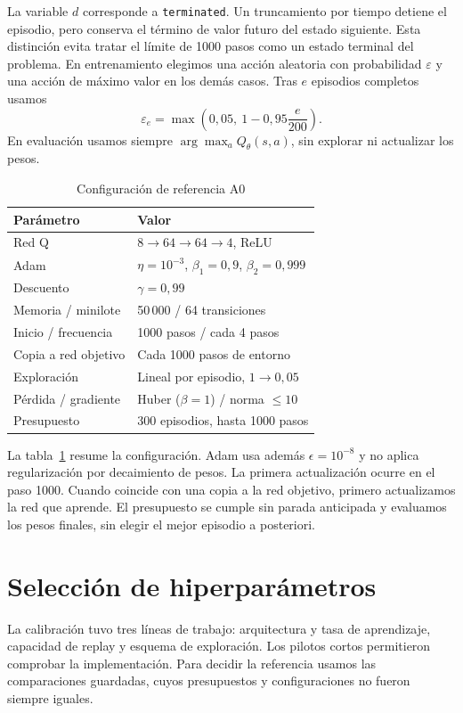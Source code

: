 \documentclass[conference]{IEEEtran}
\begin{document}
La variable $d$ corresponde a \texttt{terminated}. Un truncamiento por tiempo detiene el episodio, pero conserva el término de valor futuro del estado siguiente. Esta distinción evita tratar el límite de 1000 pasos como un estado terminal del problema. En entrenamiento elegimos una acción aleatoria con probabilidad $\varepsilon$ y una acción de máximo valor en los demás casos. Tras $e$ episodios completos usamos
\begin{equation}
 \varepsilon_e=\max\left(0{,}05,\ 1-0{,}95\frac{e}{200}\right).
\end{equation}
En evaluación usamos siempre $\arg\max_a Q_\theta(s,a)$, sin explorar ni actualizar los pesos.

\begin{table}[t]
\caption{Configuración de referencia A0}
\label{tab:hiper}
\centering
\begin{tabular}{@{}ll@{}}
\toprule
Parámetro & Valor \\
\midrule
Red Q & $8\to64\to64\to4$, ReLU \\
Adam & $\eta=10^{-3}$, $\beta_1=0{,}9$, $\beta_2=0{,}999$ \\
Descuento & $\gamma=0{,}99$ \\
Memoria / minilote & 50\,000 / 64 transiciones \\
Inicio / frecuencia & 1000 pasos / cada 4 pasos \\
Copia a red objetivo & Cada 1000 pasos de entorno \\
Exploración & Lineal por episodio, $1\to0{,}05$ \\
Pérdida / gradiente & Huber ($\beta=1$) / norma $\leq10$ \\
Presupuesto & 300 episodios, hasta 1000 pasos \\
\bottomrule
\end{tabular}
\end{table}

La tabla~\ref{tab:hiper} resume la configuración. Adam usa además $\epsilon=10^{-8}$ y no aplica regularización por decaimiento de pesos. La primera actualización ocurre en el paso 1000. Cuando coincide con una copia a la red objetivo, primero actualizamos la red que aprende. El presupuesto se cumple sin parada anticipada y evaluamos los pesos finales, sin elegir el mejor episodio a posteriori.

\section{Selección de hiperparámetros}
\label{sec:calibracion}
La calibración tuvo tres líneas de trabajo: arquitectura y tasa de aprendizaje, capacidad de replay y esquema de exploración. Los pilotos cortos permitieron comprobar la implementación. Para decidir la referencia usamos las comparaciones guardadas, cuyos presupuestos y configuraciones no fueron siempre iguales.
\end{document}
